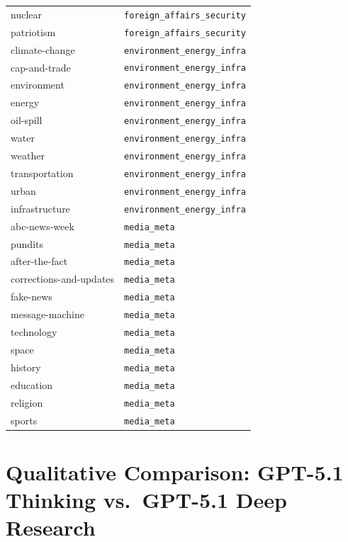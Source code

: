 \begin{longtable}{ll}
nuclear & \texttt{foreign\_affairs\_security} \\
patriotism & \texttt{foreign\_affairs\_security} \\
\midrule
climate-change & \texttt{environment\_energy\_infra} \\
cap-and-trade & \texttt{environment\_energy\_infra} \\
environment & \texttt{environment\_energy\_infra} \\
energy & \texttt{environment\_energy\_infra} \\
oil-spill & \texttt{environment\_energy\_infra} \\
water & \texttt{environment\_energy\_infra} \\
weather & \texttt{environment\_energy\_infra} \\
transportation & \texttt{environment\_energy\_infra} \\
urban & \texttt{environment\_energy\_infra} \\
infrastructure & \texttt{environment\_energy\_infra} \\
\midrule
abc-news-week & \texttt{media\_meta} \\
pundits & \texttt{media\_meta} \\
after-the-fact & \texttt{media\_meta} \\
corrections-and-updates & \texttt{media\_meta} \\
fake-news & \texttt{media\_meta} \\
message-machine & \texttt{media\_meta} \\
technology & \texttt{media\_meta} \\
space & \texttt{media\_meta} \\
history & \texttt{media\_meta} \\
education & \texttt{media\_meta} \\
religion & \texttt{media\_meta} \\
sports & \texttt{media\_meta} \\
\end{longtable}

\section{Qualitative Comparison: GPT-5.1 Thinking vs.\ GPT-5.1 Deep Research}
\label{app:gpt_deep_research_examples}

